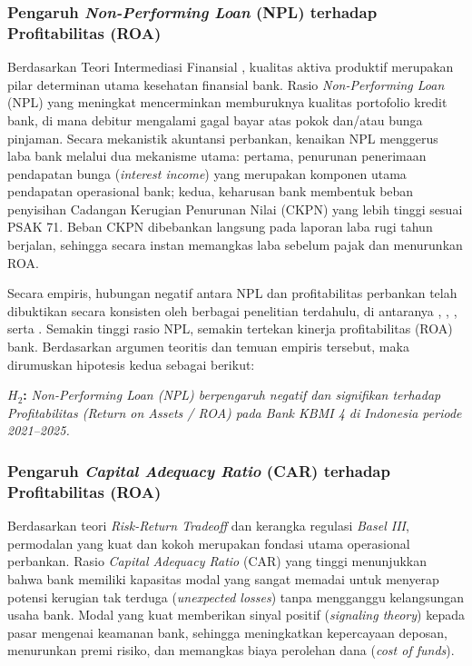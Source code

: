 \documentclass[12pt,a4paper]{article}
\numberwithin{equation}{section}
\begin{document}
\subsubsection{Pengaruh \emph{Non-Performing Loan} (NPL) terhadap Profitabilitas (ROA)}
\noindent
Berdasarkan Teori Intermediasi Finansial \citep{GurleyShaw1960, Diamond1984}, kualitas aktiva produktif merupakan pilar determinan utama kesehatan finansial bank. Rasio \emph{Non-Performing Loan} (NPL) yang meningkat mencerminkan memburuknya kualitas portofolio kredit bank, di mana debitur mengalami gagal bayar atas pokok dan/atau bunga pinjaman. Secara mekanistik akuntansi perbankan, kenaikan NPL menggerus laba bank melalui dua mekanisme utama: pertama, penurunan penerimaan pendapatan bunga (\emph{interest income}) yang merupakan komponen utama pendapatan operasional bank; kedua, keharusan bank membentuk beban penyisihan Cadangan Kerugian Penurunan Nilai (CKPN) yang lebih tinggi sesuai PSAK 71. Beban CKPN dibebankan langsung pada laporan laba rugi tahun berjalan, sehingga secara instan memangkas laba sebelum pajak dan menurunkan ROA.

\noindent
Secara empiris, hubungan negatif antara NPL dan profitabilitas perbankan telah dibuktikan secara konsisten oleh berbagai penelitian terdahulu, di antaranya \citet{PraditaSyaichu2022}, \citet{HandayaniSubowo2022}, \citet{HaryantoSudarno2023}, serta \citet{KuncoroSuhardjono2018}. Semakin tinggi rasio NPL, semakin tertekan kinerja profitabilitas (ROA) bank. Berdasarkan argumen teoritis dan temuan empiris tersebut, maka dirumuskan hipotesis kedua sebagai berikut:

\vspace{0.2cm}
\noindent \textbf{$H_2$:} \emph{Non-Performing Loan (NPL) berpengaruh negatif dan signifikan terhadap Profitabilitas (Return on Assets / ROA) pada Bank KBMI 4 di Indonesia periode 2021--2025.}

\subsubsection{Pengaruh \emph{Capital Adequacy Ratio} (CAR) terhadap Profitabilitas (ROA)}
\noindent
Berdasarkan teori \emph{Risk-Return Tradeoff} \citep{BrighamEhrhardt2020} dan kerangka regulasi \emph{Basel III}, permodalan yang kuat dan kokoh merupakan fondasi utama operasional perbankan. Rasio \emph{Capital Adequacy Ratio} (CAR) yang tinggi menunjukkan bahwa bank memiliki kapasitas modal yang sangat memadai untuk menyerap potensi kerugian tak terduga (\emph{unexpected losses}) tanpa mengganggu kelangsungan usaha bank. Modal yang kuat memberikan sinyal positif (\emph{signaling theory}) kepada pasar mengenai keamanan bank, sehingga meningkatkan kepercayaan deposan, menurunkan premi risiko, dan memangkas biaya perolehan dana (\emph{cost of funds}).
\end{document}
